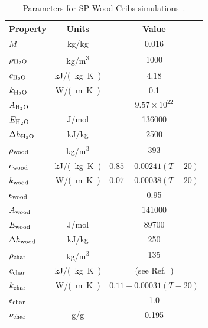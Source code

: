 \begin{table}[!ht]
\centering
\caption[Parameters for SP Wood Cribs simulations]{Parameters for SP Wood Cribs simulations~\cite{Janardhan:FSJ2021}.}
\begin{tabular}{|l|c|c|}
\hline
Property                &      Units    &      Value                           \\ \hline \hline
$M$                     &    kg/kg      & 0.016                                \\ \hline
$\rho_{\rm H_2O}$       &     \unit{kg/m^3}  & 1000                                 \\ \hline
$c_{\rm H_2O}$          & \unit{kJ/(kg.K)}    & 4.18                                 \\ \hline
$k_{\rm H_2O}$          &      \unit{W/(m.K)}    & 0.1                                  \\ \hline
$A_{\rm H_2O}$          &               & $9.57 \times 10^{22}$                \\ \hline
$E_{\rm H_2O}$          & J/mol         & 136000                               \\ \hline
$\Delta h_{\rm H_2O}$   & kJ/kg         & 2500                                 \\ \hline \hline
$\rho_{\rm wood}$       &     \unit{kg/m^3}  & 393                                  \\ \hline
$c_{\rm wood}$          &    \unit{kJ/(kg.K)}    & $0.85+0.00241(T-20)$                 \\ \hline
$k_{\rm wood}$          &      \unit{W/(m.K)}    & $0.07+0.00038(T-20)$                 \\ \hline
$\epsilon_{\rm wood}$   &               & 0.95                                 \\ \hline
$A_{\rm wood}$          &               & 141000                               \\ \hline
$E_{\rm wood}$          & J/mol         & 89700                                \\ \hline
$\Delta h_{\rm wood}$   & kJ/kg         & 250                                  \\ \hline \hline
$\rho_{\rm char}$       &     \unit{kg/m^3}  & 135                                  \\ \hline
$c_{\rm char}$          &    \unit{kJ/(kg.K)}    & (see Ref.~\cite{Janardhan:FSJ2021})  \\ \hline
$k_{\rm char}$          &      \unit{W/(m.K)}    & $0.11+0.00031(T-20)$                 \\ \hline
$\epsilon_{\rm char}$   &               & 1.0                                  \\ \hline
$\nu_{\rm char}$        & g/g           & 0.195                                \\ \hline
\end{tabular}
\label{Pine_Properties}
\end{table}


